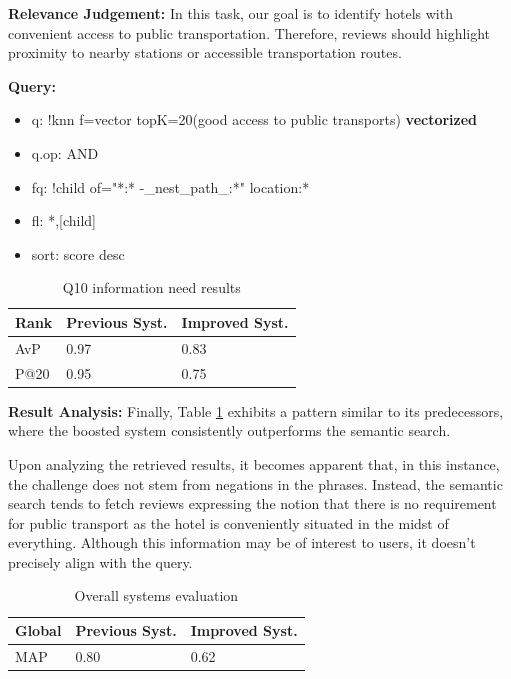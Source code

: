 \documentclass[sigconf]{acmart}
\begin{document}
\textbf{Relevance Judgement:} In this task, our goal is to identify hotels with convenient access to public transportation. Therefore, reviews should highlight proximity to nearby stations or accessible transportation routes.

\textbf{Query:}

\begin{itemize}
    \item q: {!knn f=vector topK=20}(good access to public transports) \textbf{vectorized}
    \item q.op: AND
    \item fq: {!child of="*:* -\_nest\_path\_:*"} location:*
    \item fl: *,[child]
    \item sort: score desc
\end{itemize}

\begin{table}[H]
\caption{Q10 information need results}
\label{tab:q10}
\begin{tabular}{lll}
\toprule
Rank & Previous Syst. & Improved Syst.\\
\midrule
AvP & 0.97 & 0.83  \\
P@20 & 0.95 & 0.75 \\
\bottomrule
\end{tabular}
\end{table}

\textbf{Result Analysis:} Finally, Table \ref{tab:q10} exhibits a pattern similar to its predecessors, where the boosted system consistently outperforms the semantic search.

Upon analyzing the retrieved results, it becomes apparent that, in this instance, the challenge does not stem from negations in the phrases. Instead, the semantic search tends to fetch reviews expressing the notion that there is no requirement for public transport as the hotel is conveniently situated in the midst of everything. Although this information may be of interest to users, it doesn't precisely align with the query.


\begin{table}[H]
\caption{Overall systems evaluation}
\label{tab:map_semantic}
\begin{tabular}{lll}
\toprule
Global & Previous Syst. & Improved Syst.\\
\midrule
MAP & 0.80 & 0.62  \\ 

\bottomrule
\end{tabular}
\end{table}
\end{document}
